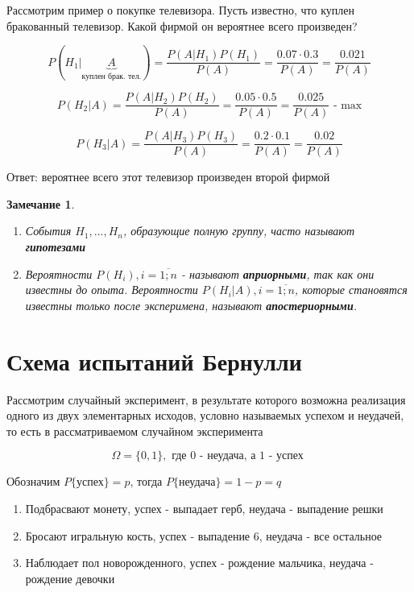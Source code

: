\documentclass[a4paper, 14pt]{report}
\newtheorem{note}{Замечание}[section]
\begin{document}
Рассмотрим пример о покупке телевизора. Пусть известно, что куплен бракованный телевизор. Какой фирмой он вероятнее всего произведен?

$$
P(H_1| \underbrace{A}_\text{куплен брак. тел.}) = \frac{P(A|H_1)P(H_1)}{P(A)} = \frac{0.07 \cdot 0.3}{P(A)} = \frac{0.021}{P(A)}
$$

$$
P(H_2|A) = \frac{P(A|H_2)P(H_2)}{P(A)} = \frac{0.05 \cdot 0.5}{P(A)} = \frac{0.025}{P(A)} \text{ - max}
$$

$$
P(H_3|A) = \frac{P(A|H_3)P(H_3)}{P(A)} = \frac{0.2 \cdot 0.1}{P(A)} = \frac{0.02}{P(A)}
$$

Ответ: вероятнее всего этот телевизор произведен второй фирмой

\begin{note}
    \begin{enumerate}
        \item События $H_1,...,H_n$, образующие полную группу, часто называют \textbf{гипотезами}
        \item Вероятности $P(H_i), i = \overline{1;n}$ - называют \textbf{априорными}, так как они известны до опыта. Вероятности $P(H_i|A), i = \overline{1;n}$, которые становятся известны только после эксперимена, называют \textbf{апостериорными}.
    \end{enumerate}
\end{note}

\section{Схема испытаний Бернулли}

Рассмотрим случайный эксперимент, в результате которого возможна реализация одного из двух элементарных исходов, условно называемых успехом и неудачей, то есть в рассматриваемом случайном эксперимента

$$
\Omega = \{ 0,1 \}, \text{ где 0 - неудача, а 1 - успех }
$$

Обозначим $P\{\text{успех}\} = p$, тогда $P\{\text{неудача}\} = 1 - p = q$

\begin{enumerate}
    \item Подбрасвают монету, успех - выпадает герб, неудача - выпадение решки
    \item Бросают игральную кость, успех - выпадение 6, неудача - все остальное
    \item Наблюдает пол новорожденного, успех - рождение мальчика, неудача - рождение девочки
\end{enumerate}
\end{document}
